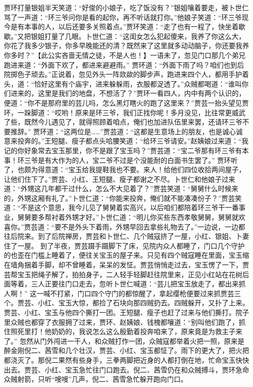 \documentclass[12pt,oneside]{book}
\begin{document}
贾环打量银姐半天笑道：“好俊的小娘子，吃了饭没有？”银姐嚷着要走，被卜世仁骂了一声道：“环三爷问你是看的起你，再不听话就打你。”他娘子笑道：“环三爷现今是有本事的人，以后还要多关照着点。”贾环笑道：“走了也有一程了，快坐着歇歇。”又把银姐打量了几眼。卜世仁道：“这闺女怎么犯起傻来，我养了你这么大，你花了我多少银子，你多早晚能还的清？既然来了这里就多动动脑子，你还要我养你多时？”【此公实吝啬无情之徒，不是人也！】一语未了，忽见门口那几个弟兄跑进来道：“外面下欢了，都进来避避雨。”
贾环道：“外面下雨了吗？咱们也到后院掷色子顽去。”正说着，忽见外头一阵欻歘的脚步声，跑进来四个人，都用手护着头，道：“恰好这里有个庙宇，进来躲躲雨，衣服都浞透了。”众贼都喝道：“谁叫你们进来的，这里是我们的地盘，不想活了？”贾环一看四人，内中有两个认识的，便道：“你不是那府里的芸儿吗，怎么黑灯瞎火的跑了这里来？”贾芸一抬头望见贾环，一跺脚道：“哎哟！原来是环三爷，我们正找你呢！多月没见，比往常更威武了些，既然今儿遇见了，就得照顾着咱点，俺们也加进队伍里来罢，还请环三爷不要推辞。”
贾环道：“这两位是……”贾芸道：“这都是生意场上的朋友，也是诚心诚意来投奔的。”王短腿、瘦子都点头哈腰笑道：“给环三爷请安。”赵姨娘过来道：“我记的你好象常去宝玉那里，你不是跟了宝玉吗？”贾芸道：“宝二爷那有环三爷有本事！环三爷是有大作为的人，宝二爷不过是个没能耐的白面书生罢了。”
贾环听了，也颇为得意道：“宝玉给我提鞋我也不要。来人！给他们四位收拾两间屋子，让他们住下了。”贾芸、小红、王短腿、瘦子都谢之不尽。卜世仁和他娘子过来道：“外甥这几年都干过什么，怎么不大见着了？”贾芸笑道：“舅舅什么时候来的，外甥这厢有礼了。”卜世仁道：“你能来投奔，俺们就不能凑凑份子？”贾芸笑道：“不是这个意思，我今儿见了舅舅着实高兴，以后咱们都陪着环三爷干一番事业，舅舅要多帮衬着外甥才好。”卜世仁道：“明儿你买些东西孝敬舅舅，舅舅就欢喜你。”贾芸道：“要不是外头下着雨，外甥早回去拿些礼物去了。”一边说，一边都往后院来。到了后院禅房，贾芸和卜世仁、几个贼寇挤了一屋，小红、银姐、卜妻住了一屋。
到了半夜，贾芸蹑手蹑脚下了床，见院内众人都睡了，门口几个守护的也歪在门槛上睡着了，便往关宝玉的屋子来。只见有四个贼寇睡在里面，宝玉缩在墙角捆着手脚，却不曾睡着，呆呆的发怔。贾芸悄悄走过去，宝玉愣了一下，贾芸帮宝玉把绳子解了，拍拍身子，二人轻手轻脚赶往院里来，正见小红站在花树后面等着，三人正要往门口走去，忽听卜世仁喊道：“芸儿把宝玉放走了，都出来抓人啊！”
这一喊不打紧，门口四个守门的都惊醒了，拿起缨枪便要过来抓贾芸三个。贾芸、小红、宝玉大惊，都捡了石块向那四贼扔去。四贼躲开，又扑了上来。贾芸、小红、宝玉与他四个撕打一团。王短腿、瘦子也赶了过来与他们撕打。院子里众贼也都穿了衣服拥了过来，贾环、赵姨娘、钱槐都嚷道：“别叫他们跑了，抓住照死里打！他奶奶的，我说怎么这么殷勤着投奔咱来了，原来竟是为救主子来了。”
忽然从门外闯进一干人，和众贼打作一团，众贼寇都举着火把一照，原来是醉金刚倪二、茜雪和几个壮汉，贾芸、小红、宝玉都怔了。雨下的更大了，把火把都浇灭了。那倪二果然有些身手，三拳两脚把近身的人都打倒在地，忙命宝玉快快出去。贾芸、小红、宝玉急忙往门口跑去。倪二、茜雪仍在和众贼搏斗，贾环急命众贼射箭，只听“嗖嗖”几声，倪二、茜雪急忙躲开跑向门口。
\end{document}
